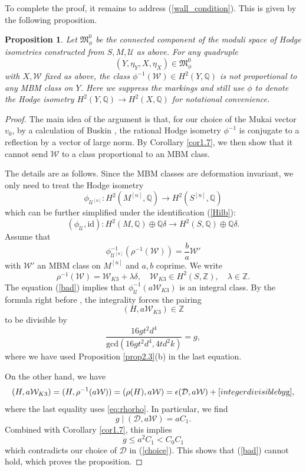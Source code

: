 \documentclass[11pt]{amsart}
\theoremstyle{plain}
\newtheorem{prop}[thm]{Proposition}
\theoremstyle{definition}
\theoremstyle{remark}
\newcommand{\BQ}{{\mathbb{Q}}}
\newcommand{\BZ}{{\mathbb{Z}}}
\newcommand{\CD}{{\mathcal D}}
\newcommand{\CU}{{\mathcal U}}
\newcommand{\CW}{{\mathcal W}}
\newcommand{\FM}{{\mathfrak{M}}}
\begin{document}
To complete the proof, it remains to address (\ref{wall_condition}). This is given by the following proposition.

\begin{prop}
Let $\FM_\phi^0$ be the connected component of the moduli space of Hodge isometries constructed from $S,M,\CU$ as above. For any quadruple 
\[
(Y, \eta_{Y}, X, \eta_X) \in \FM_{\phi}^0
\]
with $X, \CW$ fixed as above, the class $\phi^{-1}(\CW) \in H^2(Y, \BQ)$ is not proportional to any MBM class on $Y$. Here we suppress the markings and still use $\phi$ to denote the Hodge isometry $H^2(Y,\BQ) \to H^2(X,\BQ)$ for notational convenience.
\end{prop}

\begin{proof}

The main idea of the argument is that, for our choice of the Mukai vector $v_0$, 
by a calculation of Buskin \cite{Buskin},
the rational Hodge isometry $\phi^{-1}$ is conjugate to a reflection by a vector of large norm.  By Corollary \ref{cor1.7}, we then show that it cannot send $\CW$ to a class proportional to an MBM class.

The details are as follows. Since the MBM classes are deformation invariant, we only need to treat the Hodge isometry
\[
\phi_{\CU^{[n]}}: H^2(M^{[n]}, \BQ) \to H^2(S^{[n]}, \BQ)
\]
which can be further simplified under the identification (\ref{Hilb}):
\[
(\phi_\CU, \mathrm{id}): H^2(M, \BQ) \oplus \BQ\delta \to H^2(S, \BQ) \oplus \BQ\delta.
\]
Assume that 
\begin{equation}\label{bad}
\phi_{\CU^{[n]}}^{-1}(\rho^{-1}(\CW)) = \frac{b}{a} \CW'
\end{equation}
with $\CW'$ an MBM class on $M^{[n]}$ and $a, b$ coprime. We write 
\[
\rho^{-1}(\CW) = \CW_{K3} + \lambda \delta, \quad \CW_{K3} \in H^2(S,\BZ), \quad \lambda\in \BZ.
\]
The equation (\ref{bad}) implies that $\phi_{\CU}^{-1}(a\CW_{K3})$ is an integral class. By the formula right before \cite[Conclusion 3.8]{Buskin}, the integrality forces the pairing
\[
(H, a\CW_{K3}) \in \BZ
\]
to be divisible by
\[
\frac{16gt^2d^4}{\mathrm{gcd}\left(16gt^2d^4, 4td^2k\right)} = g,
\]
where we have used Proposition \ref{prop2.3}(b) in the last equation.

On the other hand, we have
\[
(H, a\CW_{K3}) = (H, \rho^{-1}(a\CW)) = (\rho(H), a\CW) = \epsilon  (\CD,a\CW) + \textup{[integer divisible by $g$]},
\]
where the last equality uses \eqref{eq:rhorho}. In particular, we find
\[
g \mid (\CD, a\CW) = aC_1. 
\]
Combined with Corollary \ref{cor1.7}, this implies 
\[
g \leq a^2C_1 < C_0C_1
\]
which contradicts our choice of $\CD$ in (\ref{choice}). This shows that (\ref{bad}) cannot hold, which proves the proposition.
\end{proof}
\end{document}
